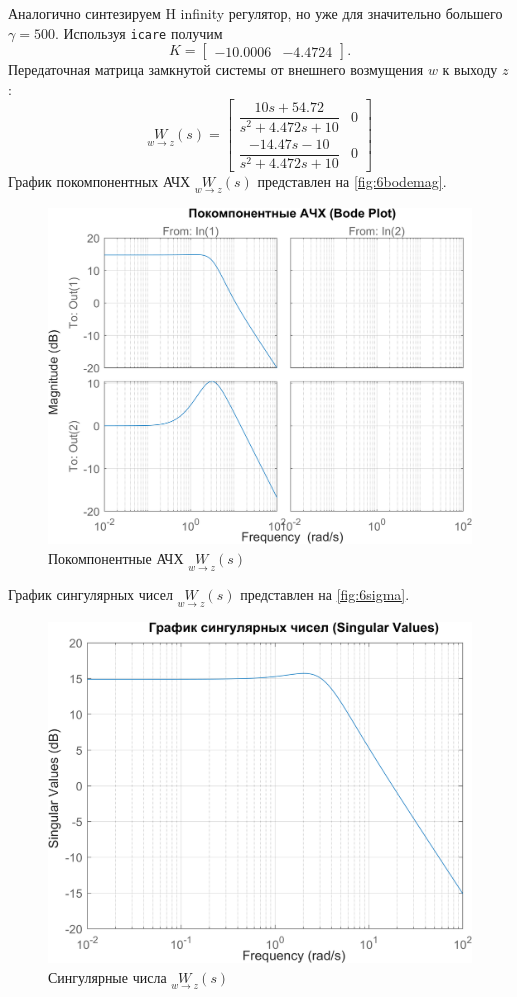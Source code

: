 Аналогично синтезируем H infinity регулятор, но уже для значительно большего $\gamma=500$.
Используя \texttt{icare} получим
\begin{equation*}
    K=\begin{bmatrix}
        -10.0006&	-4.4724
    \end{bmatrix}.
\end{equation*}
Передаточная матрица замкнутой системы от внешнего возмущения $w$ к выходу $z$:
\begin{equation*}
    \underset{w\rightarrow z}{W}(s)=\begin{bmatrix}
        \dfrac{10 s + 54.72}{s^2 + 4.472 s + 10} & 0 \\[2ex]
        \dfrac{ -14.47 s - 10}{s^2 + 4.472 s + 10} & 0
    \end{bmatrix}
\end{equation*}
График покомпонентных АЧХ $\underset{w\rightarrow z}{W}(s)$ представлен на \autoref{fig:6bodemag}.
\begin{figure}[H]
    \centering
    \includegraphics[width=0.8\linewidth]{figs/6_bodemag.png}
    \caption{Покомпонентные АЧХ $\underset{w\rightarrow z}{W}(s)$}
    \label{fig:6bodemag}
\end{figure}
График сингулярных чисел $\underset{w\rightarrow z}{W}(s)$ представлен на \autoref{fig:6sigma}.
\begin{figure}[H]
    \centering
    \includegraphics[width=0.8\linewidth]{figs/6_sigma.png}
    \caption{Сингулярные числа $\underset{w\rightarrow z}{W}(s)$}
    \label{fig:6sigma}
\end{figure}
